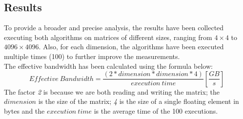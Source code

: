 \documentclass{article}
\begin{document}
\subsection{Results}
To provide a broader and precise analysis, the results have been collected executing both algorithms on matrices of different sizes,
ranging from $4 \times 4$ to $4096 \times 4096$. Also, for each dimension, the algorithms have been executed multiple times (100) to further improve the measurements. \\
The effective bandwidth has been calculated using the formula below: \\
\begin{equation*}
    Effective \: Bandwidth = \frac{\left ( \textit{2} * dimension * dimension * \textit{4} \right )}{execution\: time}
    \left[\frac{GB}{s}\right]
\end{equation*}
The factor \textit{2} is because we are both reading and writing the matrix; the $dimension$ is the size of the matrix; 
\textit{4} is the size of a single floating element in bytes and the $execution \: time$ is the average time of the 100 executions. \\
\end{document}
